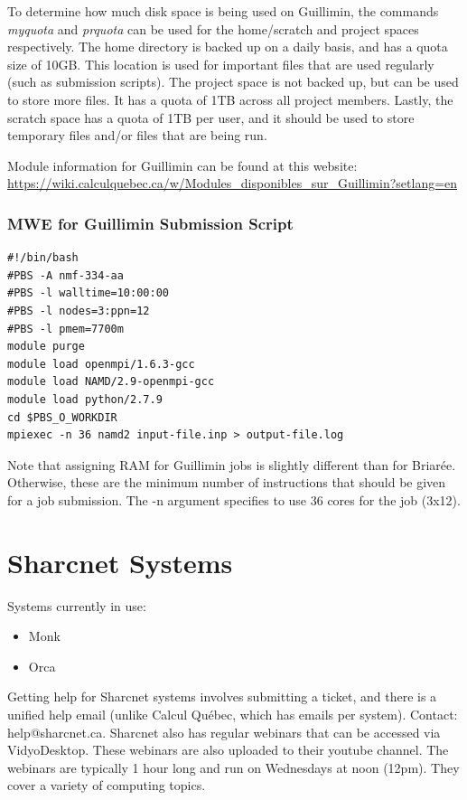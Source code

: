 \documentclass[12pt]{article}
\begin{document}
\quad To determine how much disk space is being used on Guillimin, the commands \textit{myquota} and \textit{prquota} can be used for the home/scratch and project spaces respectively. The home directory is backed up on a daily basis, and has a quota size of 10GB. This location is used for important files that are used regularly (such as submission scripts). The project space is not backed up, but can be used to store more files. It has a quota of 1TB across all project members. Lastly, the scratch space has a quota of 1TB per user, and it should be used to store temporary files and/or files that are being run.

\quad Module information for Guillimin can be found at this website: \url{https://wiki.calculquebec.ca/w/Modules_disponibles_sur_Guillimin?setlang=en}

\subsubsection{MWE for Guillimin Submission Script}

\begin{lstlisting}
#!/bin/bash
#PBS -A nmf-334-aa
#PBS -l walltime=10:00:00
#PBS -l nodes=3:ppn=12
#PBS -l pmem=7700m
module purge
module load openmpi/1.6.3-gcc
module load NAMD/2.9-openmpi-gcc
module load python/2.7.9
cd $PBS_O_WORKDIR
mpiexec -n 36 namd2 input-file.inp > output-file.log
\end{lstlisting}

\quad Note that assigning RAM for Guillimin jobs is slightly different than for Briar\'{e}e. Otherwise, these are the minimum number of instructions that should be given for a job submission. The -n argument specifies to use 36 cores for the job (3x12).

\newpage

\section{Sharcnet Systems}\label{Sharc}

\quad Systems currently in use:
\begin{itemize}
\item Monk
\item Orca
\end{itemize}

\quad Getting help for Sharcnet systems involves submitting a ticket, and there is a unified help email (unlike Calcul Qu\'{e}bec, which has emails per system). Contact: help@sharcnet.ca. Sharcnet also has regular webinars that can be accessed via VidyoDesktop. These webinars are also uploaded to their youtube channel. The webinars are typically 1 hour long and run on Wednesdays at noon (12pm). They cover a variety of computing topics.
\end{document}
